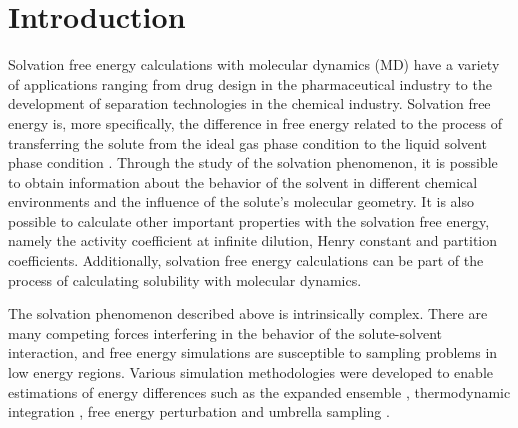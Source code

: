 \chapter{Introduction} %
\label{Chapter1} %
\pagestyle{simple}
\doublespacing
Solvation free energy calculations with molecular dynamics (MD) have a variety of applications ranging from drug design in the pharmaceutical industry to the development of separation technologies in the chemical industry. {Solvation free energy is, more specifically, the difference in free energy related to the process of transferring the solute from the ideal gas phase condition to the liquid solvent phase condition \cite{shirts2013}}. Through the study of the solvation phenomenon, it is possible to obtain information about the behavior of the solvent in different chemical environments and the influence of the solute's molecular geometry. It is also possible to calculate other important properties with the solvation free energy, namely the activity coefficient at infinite dilution, Henry constant and partition coefficients.{ Additionally, solvation free energy calculations can be part of the process of calculating solubility with molecular dynamics}. 

The solvation phenomenon described above is intrinsically complex. There are many competing forces interfering in the behavior of the solute-solvent interaction, and free energy simulations are susceptible to sampling problems in low energy regions. {Various simulation methodologies were developed to enable estimations of energy differences} such as the expanded ensemble \cite{lyubartsev}, thermodynamic integration \cite{kirkwood1935}, free energy perturbation \cite{zwanzig1954,bennet1976,mbar} and umbrella sampling \cite{TORRIE1977187}. 

